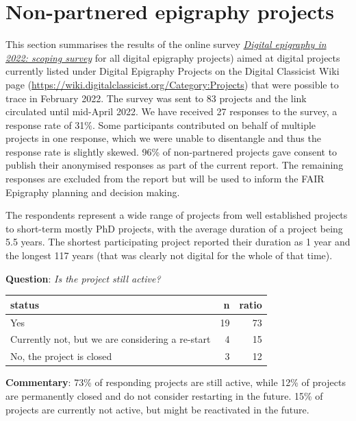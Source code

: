 \documentclass[
  12pt,
]{scrreprt}
\begin{document}
\hypertarget{non-partnered-epigraphy-projects}{%
\chapter{Non-partnered epigraphy
projects}\label{non-partnered-epigraphy-projects}}

This section summarises the results of the online survey
\href{https://github.com/FAIR-epigraphy/scoping_survey_report/data/02_Survey_projects_questions.pdf}{\emph{Digital
epigraphy in 2022: scoping survey}} for all digital epigraphy projects)
aimed at digital projects currently listed under Digital Epigraphy
Projects on the Digital Classicist Wiki page
(\url{https://wiki.digitalclassicist.org/Category:Projects}) that were
possible to trace in February 2022. The survey was sent to 83 projects
and the link circulated until mid-April 2022. We have received 27
responses to the survey, a response rate of 31\%. Some participants
contributed on behalf of multiple projects in one response, which we
were unable to disentangle and thus the response rate is slightly
skewed. 96\% of non-partnered projects gave consent to publish their
anonymised responses as part of the current report. The remaining
responses are excluded from the report but will be used to inform the
FAIR Epigraphy planning and decision making.

The respondents represent a wide range of projects from well established
projects to short-term mostly PhD projects, with the average duration of
a project being 5.5 years. The shortest participating project reported
their duration as 1 year and the longest 117 years (that was clearly not
digital for the whole of that time).

\textbf{Question}: \emph{Is the project still active?}

\begin{longtable}[]{@{}lrr@{}}
\toprule
status & n & ratio \\
\midrule
\endhead
Yes & 19 & 73 \\
Currently not, but we are considering a re-start & 4 & 15 \\
No, the project is closed & 3 & 12 \\
\bottomrule
\end{longtable}

\textbf{Commentary}: 73\% of responding projects are still active, while
12\% of projects are permanently closed and do not consider restarting
in the future. 15\% of projects are currently not active, but might be
reactivated in the future.
\end{document}
